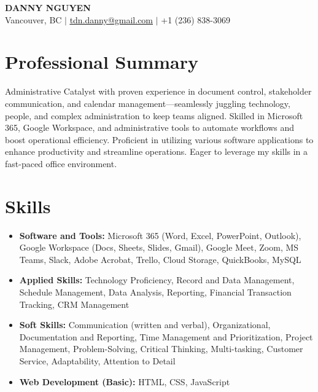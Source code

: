 \documentclass[letterpaper,11pt]{article}
\newcommand{\resumeItem}[1]{
\item\small{
{#1 \vspace{-2pt}}
}
}
\newcommand{\resumeSubHeadingListStart}{\begin{itemize}[leftmargin=0.15in, label={}]}
\newcommand{\resumeSubHeadingListEnd}{\end{itemize}}
\begin{document}
\pagecolor{black}
\color{white}

\begin{center}
\textbf{\Huge \scshape DANNY NGUYEN} \\ \vspace{1pt}
\small Vancouver, BC $|$ \href{mailto:tdn.danny@gmail.com}{\underline{tdn.danny@gmail.com}} $|$ +1 (236) 838-3069
\end{center}

\section{Professional Summary}
Administrative Catalyst with proven experience in document control, stakeholder communication, and calendar management—seamlessly juggling technology, people, and complex administration to keep teams aligned. Skilled in Microsoft 365, Google Workspace, and administrative tools to automate workflows and boost operational efficiency.  Proficient in utilizing various software applications to enhance productivity and streamline operations.  Eager to leverage my skills in a fast-paced office environment.


\section{Skills}
\resumeSubHeadingListStart
\resumeItem{\textbf{Software and Tools:} Microsoft 365 (Word, Excel, PowerPoint, Outlook), Google Workspace (Docs, Sheets, Slides, Gmail), Google Meet, Zoom, MS Teams, Slack, Adobe Acrobat, Trello, Cloud Storage, QuickBooks, MySQL}
\resumeItem{\textbf{Applied Skills:} Technology Proficiency, Record and Data Management, Schedule Management, Data Analysis, Reporting,  Financial Transaction Tracking, CRM Management}
\resumeItem{\textbf{Soft Skills:} Communication (written and verbal), Organizational, Documentation and Reporting, Time Management and Prioritization, Project Management, Problem-Solving, Critical Thinking, Multi-tasking, Customer Service, Adaptability, Attention to Detail}
\resumeItem{\textbf{Web Development (Basic): } HTML, CSS, JavaScript}
\resumeSubHeadingListEnd
\end{document}

